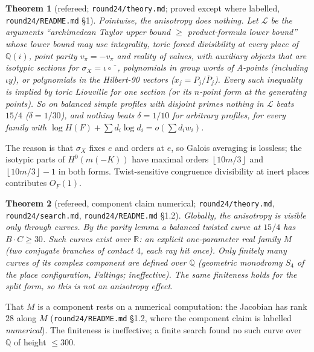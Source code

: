 \documentclass[11pt]{article}
\newtheorem{theorem}{Theorem}[section]
\newcommand{\R}{\mathbb R}
\newcommand{\Q}{\mathbb Q}
\newcommand{\floor}[1]{\left\lfloor #1 \right\rfloor}
\newcommand{\conj}[1]{\overline{#1}}
\newcommand{\LL}{\mathcal L}
\newcommand{\rec}[1]{\texttt{#1}}
\begin{document}
\begin{theorem}[refereed; \rec{round24/theory.md}; proved except where labelled, \rec{round24/README.md} \S1]\label{thm:aniso-local}
Pointwise, the anisotropy does nothing.  Let \(\LL\) be the arguments
``archimedean Taylor upper bound \(\ge\) product-formula lower bound'' whose
lower bound may use integrality, toric forced divisibility at every place of
\(\Q(i)\), point parity \(v_{\conj\pi}=-v_\pi\) and reality of values, with
auxiliary objects that are isotypic sections for
\(\sigma_X=\iota\circ\overline{\phantom{x}}\), polynomials in group words of
A-points (including \(\iota y\)), or polynomials in the Hilbert-90 vectors
(\(x_j=P_j/\conj P_j\)).  Every such inequality is implied by toric Liouville
for one section (or its \(n\)-point form at the generating points).  So on
balanced simple profiles with disjoint primes nothing in \(\LL\) beats
\(15/4\) (\(\delta=1/30\)), and nothing beats \(\delta=1/10\) for arbitrary
profiles, for every family with
\(\log H(F)+\sum d_i\log d_i=o(\sum d_iw_i)\).
\end{theorem}

The reason is that \(\sigma_X\) fixes \(e\) and orders at \(e\), so Galois
averaging is lossless; the isotypic parts of \(H^0(m(-K))\) have maximal orders
\(\floor{10m/3}\) and \(\floor{10m/3}-1\) in both forms.  Twist-sensitive
congruence divisibility at inert places contributes \(O_F(1)\).

\begin{theorem}[refereed, component claim numerical; \rec{round24/theory.md}, \rec{round24/search.md}, \rec{round24/README.md} \S1.2]\label{thm:aniso-global}
Globally, the anisotropy is visible only through curves.  By the parity lemma
a balanced twisted curve at \(15/4\) has \(B\cdot C\ge30\).  Such curves exist
over \(\R\): an explicit one-parameter real family \(M\) (two conjugate
branches of contact \(4\), each ray hit once).  Only finitely many curves of
its complex component are defined over \(\Q\) (geometric monodromy \(S_4\) of
the place configuration, Faltings; ineffective).  The same finiteness holds
for the split form, so this is not an anisotropy effect.
\end{theorem}

That \(M\) is a component rests on a numerical computation: the Jacobian has
rank \(28\) along \(M\) (\rec{round24/README.md} \S1.2, where the component
claim is labelled \emph{numerical}).  The finiteness is ineffective; a finite
search found no such curve over \(\Q\) of height \(\le300\).
\end{document}

